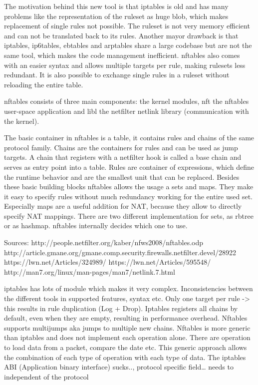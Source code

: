 The motivation behind this new tool is that iptables is old and has many
problems like the representation of the ruleset as huge blob, which
makes replacement of single rules not possible. The ruleset is not very
memory efficient and can not be translated back to its rules. Another
mayor drawback is that iptables, ip6tables, ebtables and arptables share
a large codebase but are not the same tool, which makes the code
management inefficient. nftables also comes with an easier syntax and
allows multiple targets per rule, making rulesets less redundant. It is
also possible to exchange single rules in a ruleset without reloading
the entire table.

nftables consists of three main components: the kernel modules, nft the
nftables user-space application and libl the netfilter netlink library
(communication with the kernel).

The basic container in nftables is a table, it contains rules and chains
of the same protocol family. Chains are the containers for rules and can
be used as jump targets. A chain that registers with a netfilter hook is
called a base chain and serves as entry point into a table. Rules are
container of expressions, which define the runtime behavior and are the
smallest unit that can be replaced. Besides these basic building blocks
nftables allows the usage a sets and maps. They make it easy to specify
rules without much redundancy working for the entire used set.
Especially maps are a useful addition for NAT, because they allow to
directly specify NAT mappings. There are two different implementation
for sets, as rbtree or as hashmap. nftables internally decides which one
to use.

Sources: http://people.netfilter.org/kaber/nfws2008/nftables.odp
http://article.gmane.org/gmane.comp.security.firewalls.netfilter.devel/28922
https://lwn.net/Articles/324989/ https://lwn.net/Articles/595548/
http://man7.org/linux/man-pages/man7/netlink.7.html

iptables has lots of module which makes it very complex. Inconsistencies
between the different tools in supported features, syntax etc. Only one
target per rule -\textgreater{} this results in rule duplication (Log +
Drop). Iptables registers all chains by default, even when they are
empty, resulting in performance overhead. Nftables supports multijumps
aka jumps to multiple new chains. Nftables is more generic than iptables
and does not implement each operation alone. There are operation to load
data from a packet, compare the date etc. This generic approach allows
the combination of each type of operation with each type of data. The
iptables ABI (Application binary interface) sucks.., protocol specific
field\ldots{} needs to independent of the protocol

